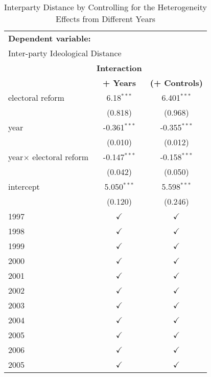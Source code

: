 \begin{table}[ht]
\caption{Interparty Distance by Controlling for the Heterogeneity Effects from Different Years \label{tab:heterogeneity of bills}}
\centering{}%
\begin{tabular}{lcc}
\toprule 
\multicolumn{3}{l}{\textbf{Dependent variable:}}                                                            \tabularnewline
\multicolumn{3}{l}{Inter-party Ideological Distance}                                                        \tabularnewline
\midrule
                                & \footnotesize{\textbf{Interaction}} &                                      \tabularnewline
                                & \footnotesize{\textbf{+ Years}}     & \footnotesize{\textbf{(+ Controls)}} \tabularnewline
\midrule
\footnotesize{electoral reform} & \footnotesize{6.18$^{***}$}  & \footnotesize{6.401$^{***}$}  \tabularnewline
                                & \footnotesize{(0.818)}       & \footnotesize{(0.968)}        \tabularnewline
\footnotesize{year}             & \footnotesize{-0.361$^{***}$}& \footnotesize{-0.355$^{***}$} \tabularnewline
                                & \footnotesize{(0.010)}       & \footnotesize{(0.012)}        \tabularnewline
\footnotesize{year$\times$ electoral reform}   & \footnotesize{-0.147$^{***}$}   & \footnotesize{-0.158$^{***}$} \tabularnewline
                                & \footnotesize{(0.042)}       & \footnotesize{(0.050)}       \tabularnewline
\footnotesize{intercept}        & \footnotesize{5.050$^{***}$} & \footnotesize{5.598$^{***}$} \tabularnewline
                                & \footnotesize{(0.120)}       & \footnotesize{(0.246)}       \tabularnewline
\footnotesize{1997}             & $\checkmark$         & $\checkmark$  \tabularnewline
\footnotesize{1998}             & $\checkmark$         & $\checkmark$  \tabularnewline
\footnotesize{1999}             & $\checkmark$         & $\checkmark$  \tabularnewline
\footnotesize{2000}             & $\checkmark$         & $\checkmark$  \tabularnewline
\footnotesize{2001}             & $\checkmark$         & $\checkmark$  \tabularnewline
\footnotesize{2002}             & $\checkmark$         & $\checkmark$  \tabularnewline
\footnotesize{2003}             & $\checkmark$         & $\checkmark$  \tabularnewline
\footnotesize{2004}             & $\checkmark$         & $\checkmark$  \tabularnewline
\footnotesize{2005}             & $\checkmark$         & $\checkmark$  \tabularnewline
\footnotesize{2006}             & $\checkmark$         & $\checkmark$  \tabularnewline
\footnotesize{2005}             & $\checkmark$         & $\checkmark$  \tabularnewline

\end{tabular}
\end{table}
